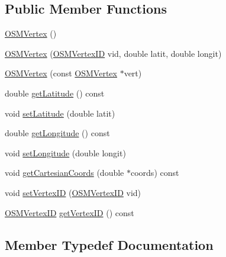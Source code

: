 \subsection*{Public Member Functions}
\begin{DoxyCompactItemize}
\item 
\hyperlink{classbridges_1_1dataset_1_1_o_s_m_vertex_aa5d6ef7aef3bb762665aa6ab3a2658f6}{O\+S\+M\+Vertex} ()
\item 
\hyperlink{classbridges_1_1dataset_1_1_o_s_m_vertex_a9ad9739ae1da536fe5e66b2f07b8ba1d}{O\+S\+M\+Vertex} (\hyperlink{classbridges_1_1dataset_1_1_o_s_m_vertex_ad166f13b0aefbdc05a273546f2a3bb96}{O\+S\+M\+Vertex\+ID} vid, double latit, double longit)
\item 
\hyperlink{classbridges_1_1dataset_1_1_o_s_m_vertex_a0459f92f161c9e1d465c5142b947a704}{O\+S\+M\+Vertex} (const \hyperlink{classbridges_1_1dataset_1_1_o_s_m_vertex}{O\+S\+M\+Vertex} $\ast$vert)
\item 
double \hyperlink{classbridges_1_1dataset_1_1_o_s_m_vertex_a1f41a5f01d68747ee04b5c5eaa629c6e}{get\+Latitude} () const
\item 
void \hyperlink{classbridges_1_1dataset_1_1_o_s_m_vertex_af4ab2d69122919f504b78bd9540ccaa1}{set\+Latitude} (double latit)
\item 
double \hyperlink{classbridges_1_1dataset_1_1_o_s_m_vertex_a98e17875d886a63ed73a6f77cc26686d}{get\+Longitude} () const
\item 
void \hyperlink{classbridges_1_1dataset_1_1_o_s_m_vertex_a48e077133233ba705342ba955c6fdc23}{set\+Longitude} (double longit)
\item 
void \hyperlink{classbridges_1_1dataset_1_1_o_s_m_vertex_a0151ea438e8265b184a91c9591aa8a12}{get\+Cartesian\+Coords} (double $\ast$coords) const
\item 
void \hyperlink{classbridges_1_1dataset_1_1_o_s_m_vertex_ae16bbcdef938da97f2c665825ecac346}{set\+Vertex\+ID} (\hyperlink{classbridges_1_1dataset_1_1_o_s_m_vertex_ad166f13b0aefbdc05a273546f2a3bb96}{O\+S\+M\+Vertex\+ID} vid)
\item 
\hyperlink{classbridges_1_1dataset_1_1_o_s_m_vertex_ad166f13b0aefbdc05a273546f2a3bb96}{O\+S\+M\+Vertex\+ID} \hyperlink{classbridges_1_1dataset_1_1_o_s_m_vertex_a92f3b28a05940e4c45a0cf933c3fab2c}{get\+Vertex\+ID} () const
\end{DoxyCompactItemize}


\subsection{Member Typedef Documentation}
\mbox{\label{classbridges_1_1dataset_1_1_o_s_m_vertex_ad166f13b0aefbdc05a273546f2a3bb96}} 
